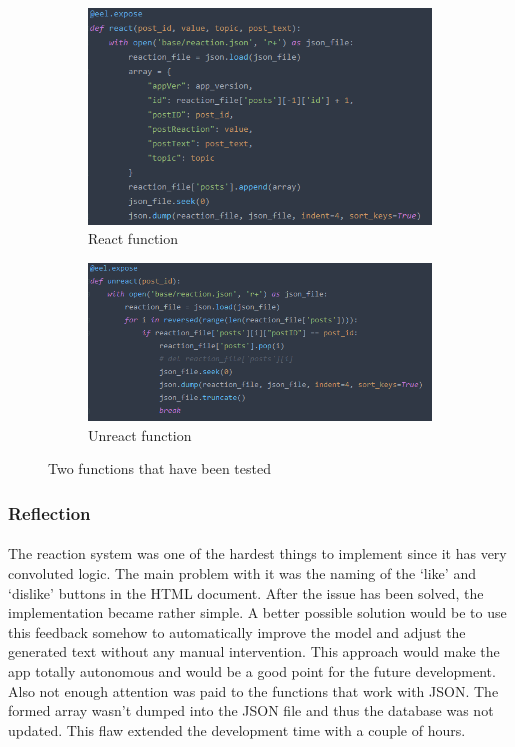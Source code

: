 \documentclass[12pt]{report}
\begin{document}
\begin{figure}[ht]
  \captionsetup[subfigure]{labelformat=empty}
  \centering
  \begin{subfigure}{.5\textwidth}
    \centering
    \includegraphics[width=.8\linewidth]{img/react-function.png}
    \caption{React function}
    \label{fig:react-func}
  \end{subfigure}%
  \begin{subfigure}{.5\textwidth}
    \centering
    \includegraphics[width=1\linewidth]{img/unreact-function.png}
    \caption{Unreact function}
    \label{fig:unreact-func}
  \end{subfigure}
  \caption{Two functions that have been tested}
  \label{fig:react-unreact-funcs}
\end{figure}


\subsubsection*{Reflection}
\paragraph{}
The reaction system was one of the hardest things to implement since it has very convoluted logic. The main problem with
it was the naming of the `like' and `dislike' buttons in the HTML document. After the issue has been solved, the implementation
became rather simple. A better possible solution would be to use this feedback somehow to automatically improve
the model and adjust the generated text without any manual intervention. This approach would make the app 
totally autonomous and would be a good point for the future development. Also not enough attention was paid to the
functions that work with JSON. The formed array wasn't dumped into the JSON file and thus the database was not updated.
This flaw extended the development time with a couple of hours.
\end{document}
